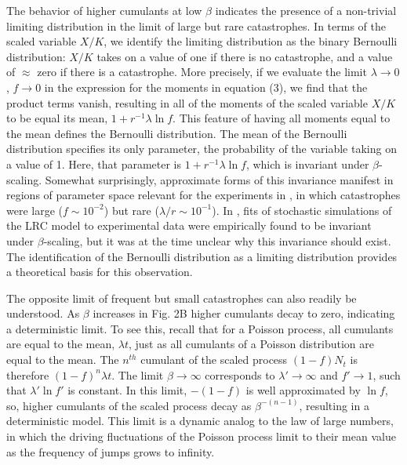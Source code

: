 The behavior of higher cumulants at low $\beta$ indicates the presence of a non-trivial limiting distribution in the limit of large but rare catastrophes. In terms of the scaled variable $X/K$, we identify the limiting distribution as the binary Bernoulli distribution: $X/K$ takes on a value of one if there is no catastrophe, and a value of $\approx$ zero if there is a catastrophe. More precisely, if we evaluate the limit $\lambda \to 0$, $f \to 0$ in the expression for the moments in equation (3), we find that the product terms vanish, resulting in all of the moments of the scaled variable $X/K$ to be equal its mean, $1+r^{-1}\lambda\ln f$. This feature of having all moments equal to the mean defines the Bernoulli distribution. The mean of the Bernoulli distribution specifies its only parameter, the probability of the variable taking on a value of 1. Here, that parameter is $1+r^{-1}\lambda\ln f$, which is invariant under $\beta$-scaling. Somewhat surprisingly, approximate forms of this invariance manifest in regions of parameter space relevant for the experiments in \cite{wilesPLOS2016}, in which catastrophes were large ($f\sim 10^{-2}$) but rare ($\lambda/r \sim 10^{-1}$). In \cite{wilesPLOS2016}, fits of stochastic simulations of the LRC model to experimental data were empirically found to be invariant under $\beta$-scaling, but it was at the time unclear why this invariance should exist. The identification of the Bernoulli distribution as a limiting distribution provides a theoretical basis for this observation. 

The opposite limit of frequent but small catastrophes can also readily be understood. As $\beta$ increases in Fig. 2B higher cumulants decay to zero, indicating a deterministic limit. To see this, recall that for a Poisson process, all cumulants are equal to the mean, $\lambda t$, just as all cumulants of a Poisson distribution are equal to the mean.  The $n^{th}$ cumulant of the scaled process $(1-f)N_t$ is therefore $(1-f)^n\lambda t$. The limit $\beta \to \infty$ corresponds to $\lambda'\to\infty$ and $f'\to 1$, such that $\lambda'\ln f'$ is constant.  In this limit, $-(1-f)$ is well approximated by $\ln f$, so, higher cumulants of the scaled process decay as $\beta^{-(n-1)}$, resulting in a deterministic model. This limit is a dynamic analog to the law of large numbers, in which the driving fluctuations of the Poisson process limit to their mean value as the frequency of jumps grows to infinity. 

